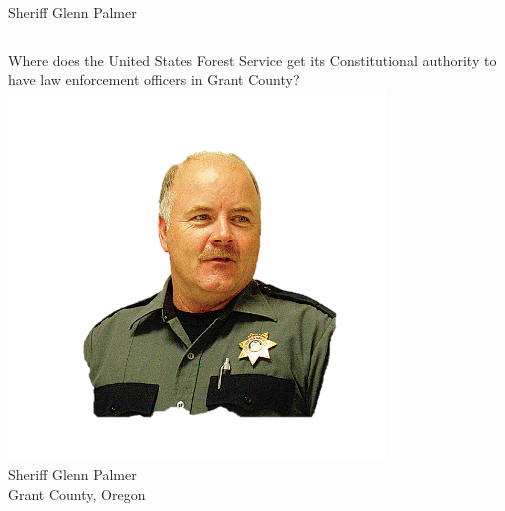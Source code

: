\begin{frame}{Sheriff Glenn Palmer}
    \begin{columns}[onlytextwidth]
            \centering
            Where does the United States Forest Service get its Constitutional authority to have law enforcement officers in Grant County?
            \centering
            \includegraphics[width=0.75\textwidth]{img/glenn-palmer.png}
            \\ Sheriff Glenn Palmer
            \\ Grant County, Oregon
    \end{columns}
\end{frame}

